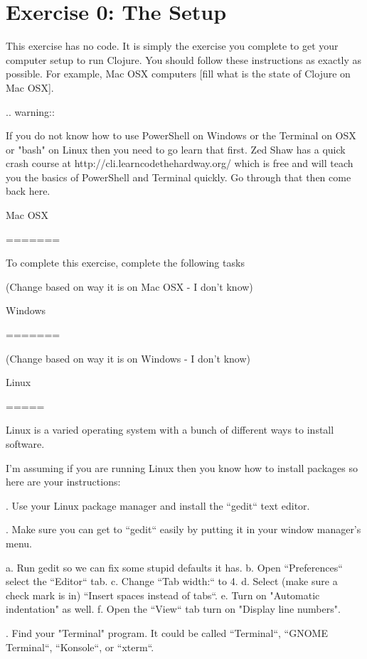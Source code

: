 \chapter{Exercise 0: The Setup}

This exercise has no code.  It is simply the exercise you complete	
to get your computer setup to run Clojure. You should follow these instructions
as exactly as possible.  For example, Mac OSX computers [fill what is the state of Clojure on Mac OSX].
	
	
.. warning::
	
	
    If you do not know how to use PowerShell on Windows or the Terminal on
    OSX or "bash" on Linux then you need to go learn that first.  Zed Shaw has
    a quick crash course at http://cli.learncodethehardway.org/ which is free
    and will teach you the basics of PowerShell and Terminal quickly. Go
    through that then come back here.
	
	
Mac OSX
	
=======
	
	
To complete this exercise, complete the following tasks

(Change based on way it is on Mac OSX - I don't know)

Windows
	
=======

(Change based on way it is on Windows - I don't know)	
	
Linux
	
=====
	
	
Linux is a varied operating system with a bunch of different ways to install software.
	
I'm assuming if you are running Linux then you know how to install packages so here are your instructions:
	
	
. Use your Linux package manager and install the ``gedit`` text editor.
	
. Make sure you can get to ``gedit`` easily by putting it in your window manager's menu.
	
	
   a. Run gedit so we can fix some stupid defaults it has.
   b. Open ``Preferences`` select the ``Editor`` tab.
   c. Change ``Tab width:`` to 4.
   d. Select (make sure a check mark is in) ``Insert spaces instead of tabs``.
   e. Turn on "Automatic indentation" as well.
   f. Open the ``View`` tab turn on "Display line numbers".

	
. Find your "Terminal" program.  It could be called ``Terminal``, ``GNOME Terminal``, ``Konsole``, or ``xterm``.
	
